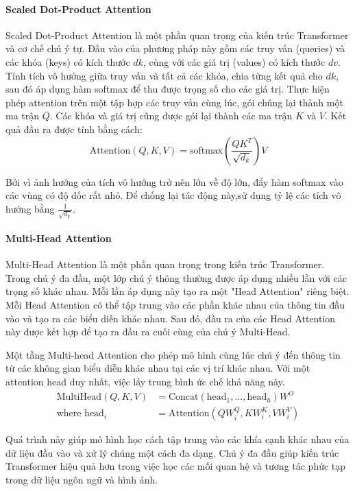 \paragraph{Scaled Dot-Product Attention}
Scaled Dot-Product Attention là một phần quan trọng của kiến trúc Transformer và cơ chế chú ý tự. Đầu vào của phương pháp này gồm các truy vấn (queries) và các khóa (keys) có kích thước $dk$, cùng với các giá trị (values) có kích thước $dv$. Tính tích vô hướng giữa truy vấn và tất cả các khóa, chia từng kết quả cho $dk$, sau đó áp dụng hàm softmax để thu được trọng số cho các giá trị. Thực hiện phép attention trên một tập hợp các truy vấn cùng lúc, gói chúng lại thành một ma trận $Q$. Các khóa và giá trị cũng được gói lại thành các ma trận $K$ và $V$. Kết quả đầu ra được tính bằng cách:
\[
    \text{Attention}(Q, K, V) = \text{softmax} (\frac{ QK^T }{ \sqrt{d_k} }) V   
\]

Bởi vì ảnh hưởng của tích vô hướng trở nên lớn về độ lớn, đẩy hàm softmax vào các vùng có độ dốc rất nhỏ.  Để chống lại tác động này,sử dụng tỷ lệ các tích vô hướng bằng \(\frac{1}{\sqrt{d_k}}\).

\paragraph{Multi-Head Attention}
Multi-Head Attention là một phần quan trọng trong kiến trúc Transformer. Trong chú ý đa đầu, một lớp chú ý thông thường được áp dụng nhiều lần với các trọng số khác nhau. Mỗi lần áp dụng này tạo ra một "Head Attention" riêng biệt. Mỗi Head Attention có thể tập trung vào các phần khác nhau của thông tin đầu vào và tạo ra các biểu diễn khác nhau. Sau đó, đầu ra của các Head Attention này được kết hợp để tạo ra đầu ra cuối cùng của chú ý Multi-Head.

Một tầng Multi-head Attention cho phép mô hình cùng lúc chú ý đến thông tin từ các không gian biểu diễn khác nhau tại các vị trí khác nhau. Với một attention head duy nhất, việc lấy trung bình ức chế khả năng này\cite{vaswani2023attention}.
\begin{align*}
    \text{MultiHead}(Q, K, V) &= \text{Concat}(\text{head}_1, \ldots, \text{head}_h)W^O \\
    \text{where head}_i &= \text{Attention}(QW_i^Q, KW_i^K, VW_i^V)
\end{align*}

Quá trình này giúp mô hình học cách tập trung vào các khía cạnh khác nhau của dữ liệu đầu vào và xử lý chúng một cách đa dạng. Chú ý đa đầu giúp kiến trúc Transformer hiệu quả hơn trong việc học các mối quan hệ và tương tác phức tạp trong dữ liệu ngôn ngữ và hình ảnh.

